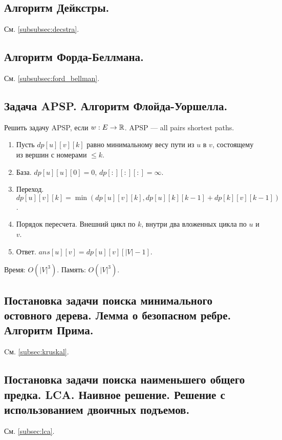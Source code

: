 \documentclass[a4paper,14pt]{article}
\begin{document}
    \subsection{Алгоритм Дейкстры.}
    См. \ref{subsubsec:decstra}.
    \subsection{Алгоритм Форда-Беллмана.}
    См. \ref{subsubsec:ford_bellman}.
    \subsection{Задача APSP. Алгоритм Флойда-Уоршелла.}
    \begin{problem}
        Решить задачу APSP, если $w : E \rightarrow \mathbb{R}$.
        APSP — all pairs shortest paths.
    \end{problem}
    \begin{enumerate}
        \item Пусть $dp[u][v][k]$ равно минимальному весу пути из $u$ в $v$,
        состоящему из вершин с номерами $\leqslant k$.
        \item База. $dp[u][u][0] = 0$, $dp[:][:][:] = \infty$.
        \item Переход. $dp[u][v][k] = \min(dp[u][v][k], dp[u][k][k-1] + dp[k][v][k-1])$.
        \item Порядок пересчета. Внешний цикл по $k$, внутри два вложенных цикла по $u$ и $v$.
        \item Ответ. $ans[u][v] = dp[u][v][|V|-1]$.
    \end{enumerate}
    Время: $O(|V|^3)$. Память: $O(|V|^3)$.

    \subsection{Постановка задачи поиска минимального остовного дерева. Лемма о безопасном ребре. Алгоритм Прима.}
    Cм. \ref{subsec:kruskal}.
    \subsection{Постановка задачи поиска наименьшего общего предка. LCA. Наивное решение. Решение с использованием двоичных подъемов.}
    См. \ref{subsec:lca}.
\end{document}
